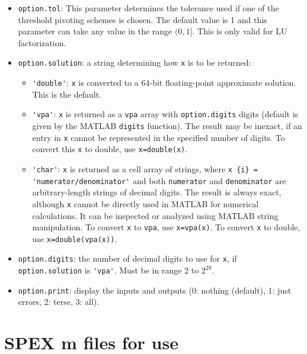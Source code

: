 \documentclass[12pt]{report}
\theoremstyle{definition}
\begin{document}
\begin{itemize}
\item \verb|option.tol|: This parameter determines the tolerance used if one of
the threshold pivoting schemes is chosen. The default value is 1 and this
parameter can take any value in the range $(0,1]$. This is only valid
for LU factorization.

\item \verb|option.solution|:
    a string determining how \verb|x| is to be returned:

    \begin{itemize}
        \item \verb|'double'|:  \verb|x| is converted to a 64-bit
            floating-point approximate solution.  This is the default.
        \item \verb|'vpa'|:  \verb|x| is returned as a \verb|vpa| array with
            \verb|option.digits| digits (default is given by the MATLAB
            \verb|digits| function).  The result may be inexact, if an entry in
            \verb|x| cannot be represented in the specified number of digits.
            To convert this \verb|x| to double, use \verb|x=double(x)|.
        \item \verb|'char'|:  \verb|x| is returned as a cell array of strings,
            where \verb|x {i} =| \newline \verb|'numerator/denominator'| and both
            \verb|numerator| and \verb|denominator| are arbitrary-length
            strings of decimal digits.  The result is always exact, although
            \verb|x| cannot be directly used in MATLAB for numerical
            calculations.  It can be inspected or analyzed using MATLAB string
            manipulation.  To convert \verb|x| to \verb|vpa|, use
            \verb|x=vpa(x)|.  To convert \verb|x| to double, use
            \verb|x=double(vpa(x))|.
    \end{itemize}

\item \verb|option.digits|: the number of decimal digits to use for \verb|x|, if
        \verb|option.solution| is \verb|'vpa'|.  Must be in range 2 to $2^{29}$.

\item \verb|option.print|: display the inputs and outputs
        (0: nothing (default), 1: just errors, 2: terse, 3: all).

\end{itemize}

\section{SPEX m files for use} \label{s:Use:MATLAB:factor}
\end{document}
